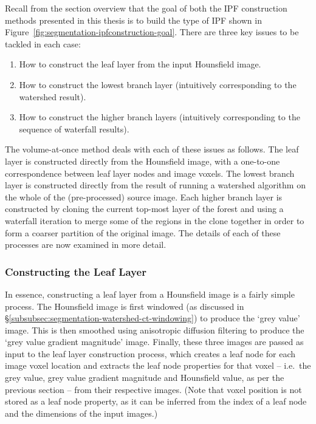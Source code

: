 
Recall from the section overview that the goal of both the IPF construction methods presented in this thesis is to build the type of IPF shown in Figure~\ref{fig:segmentation-ipfconstruction-goal}. There are three key issues to be tackled in each case:
%
\begin{enumerate}
\item How to construct the leaf layer from the input Hounsfield image.
\item How to construct the lowest branch layer (intuitively corresponding to the watershed result).
\item How to construct the higher branch layers (intuitively corresponding to the sequence of waterfall results).
\end{enumerate}
%
The volume-at-once method deals with each of these issues as follows. The leaf layer is constructed directly from the Hounsfield image, with a one-to-one correspondence between leaf layer nodes and image voxels. The lowest branch layer is constructed directly from the result of running a watershed algorithm on the whole of the (pre-processed) source image. Each higher branch layer is constructed by cloning the current top-most layer of the forest and using a waterfall iteration to merge some of the regions in the clone together in order to form a coarser partition of the original image. The details of each of these processes are now examined in more detail.

\subsubsection{Constructing the Leaf Layer}

In essence, constructing a leaf layer from a Hounsfield image is a fairly simple process. The Hounsfield image is first windowed (as discussed in \S\ref{subsubsec:segmentation-watershed-ct-windowing}) to produce the `grey value' image. This is then smoothed using anisotropic diffusion filtering to produce the `grey value gradient magnitude' image. Finally, these three images are passed as input to the leaf layer construction process, which creates a leaf node for each image voxel location and extracts the leaf node properties for that voxel -- i.e.~the grey value, grey value gradient magnitude and Hounsfield value, as per the previous section -- from their respective images. (Note that voxel position is not stored as a leaf node property, as it can be inferred from the index of a leaf node and the dimensions of the input images.)

